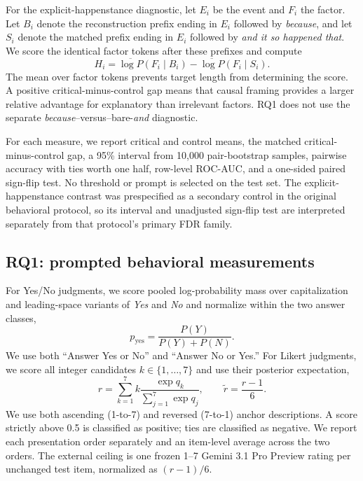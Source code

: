 For the explicit-happenstance diagnostic, let $E_i$ be the event and $F_i$ the factor. Let $B_i$ denote the reconstruction prefix ending in $E_i$ followed by \emph{because}, and let $S_i$ denote the matched prefix ending in $E_i$ followed by \emph{and it so happened that}. We score the identical factor tokens after these prefixes and compute
\begin{equation}
 H_i=\overline{\log P}(F_i\mid B_i)-\overline{\log P}(F_i\mid S_i).
\end{equation}
The mean over factor tokens prevents target length from determining the score. A positive critical-minus-control gap means that causal framing provides a larger relative advantage for explanatory than irrelevant factors. RQ1 does not use the separate \emph{because}--versus--bare-\emph{and} diagnostic.

For each measure, we report critical and control means, the matched critical-minus-control gap, a 95\% interval from 10,000 pair-bootstrap samples, pairwise accuracy with ties worth one half, row-level ROC-AUC, and a one-sided paired sign-flip test. No threshold or prompt is selected on the test set. The explicit-happenstance contrast was prespecified as a secondary control in the original behavioral protocol, so its interval and unadjusted sign-flip test are interpreted separately from that protocol's primary FDR family.

\subsection{RQ1: prompted behavioral measurements}
For Yes/No judgments, we score pooled log-probability mass over capitalization and leading-space variants of \emph{Yes} and \emph{No} and normalize within the two answer classes,
\begin{equation}
 p_{\mathrm{yes}} = \frac{P(Y)}{P(Y)+P(N)}.
\end{equation}
We use both ``Answer Yes or No'' and ``Answer No or Yes.'' For Likert judgments, we score all integer candidates $k\in\{1,\ldots,7\}$ and use their posterior expectation,
\begin{equation}
 r = \sum_{k=1}^{7} k\frac{\exp q_k}{\sum_{j=1}^{7}\exp q_j},
 \qquad \tilde r=\frac{r-1}{6}.
\end{equation}
We use both ascending (1-to-7) and reversed (7-to-1) anchor descriptions. A score strictly above 0.5 is classified as positive; ties are classified as negative. We report each presentation order separately and an item-level average across the two orders. The external ceiling is one frozen 1--7 Gemini 3.1 Pro Preview rating per unchanged test item, normalized as $(r-1)/6$.

